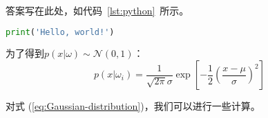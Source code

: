 \documentclass{hw}
\begin{document}
\begin{answer}
答案写在此处，如代码~\ref{lst:python}~所示。

\begin{lstlisting}[language=python,caption=代码测试,label=lst:python]
print('Hello, world!')
\end{lstlisting}

为了得到\(p(x | \omega) \sim \mathcal{N}(0, 1)\)：
\begin{equation}
	p(x | \omega_i) = \frac{1}{\sqrt{2 \pi} \sigma}\exp{\left[- \frac{1}{2} \left(\frac{x - \mu}{\sigma}\right)^2\right]}
	\label{eq:Gaussian-distribution}
\end{equation}

对式 (\ref{eq:Gaussian-distribution})，我们可以进行一些计算。

\end{answer}
\end{document}
